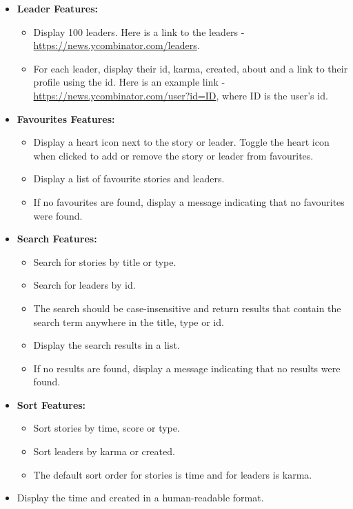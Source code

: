 \documentclass{article}
\begin{document}
\begin{itemize}
\begin{itemize}
			\item \textbf{Leader Features:}
			\begin{itemize}
				\item Display 100 leaders. Here is a link to the leaders - \href{https://news.ycombinator.com/leaders}{https://news.ycombinator.com/leaders}. 
				\item For each leader, display their id, karma, created, about and a link to their profile using the id. Here is an example link - \href{https://news.ycombinator.com/user?id=ID}{https://news.ycombinator.com/user?id=ID}, where ID is the user's id. 
			\end{itemize}
			\item \textbf{Favourites Features:}
			\begin{itemize}
				\item Display a heart icon next to the story or leader. Toggle the heart icon when clicked to add or remove the story or leader from favourites. 
				\item Display a list of favourite stories and leaders. 
				\item If no favourites are found, display a message indicating that no favourites were found.
			\end{itemize}
			\item \textbf{Search Features:}
			\begin{itemize}
				\item Search for stories by title or type.
				\item Search for leaders by id.
				\item The search should be case-insensitive and return results that contain the search term anywhere in the title, type or id.
				\item Display the search results in a list. 
				\item If no results are found, display a message indicating that no results were found.
			\end{itemize}
			\item \textbf{Sort Features:}
			\begin{itemize}
				\item Sort stories by time, score or type. 
				\item Sort leaders by karma or created. 
				\item The default sort order for stories is time and for leaders is karma.
			\end{itemize}
			\item Display the time and created in a human-readable format. 

\end{itemize}
\end{itemize}
\end{document}
